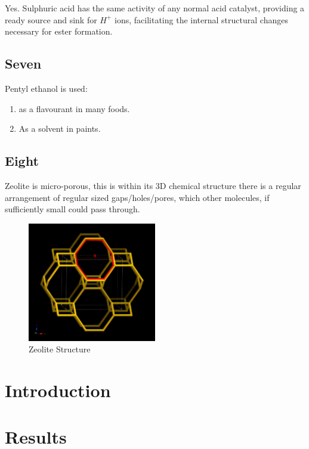 \documentclass[]{article}
\begin{document}
Yes. Sulphuric acid has the same activity of any normal acid catalyst,
providing a ready source and sink for \(H^{+}\) ions, facilitating the
internal structural changes necessary for ester formation.

\hypertarget{seven}{%
\subsection{Seven}\label{seven}}

Pentyl ethanol is used:

\begin{enumerate}
\def\labelenumi{\arabic{enumi}.}
\item
  as a flavourant in many foods.
\item
  As a solvent in paints.
\end{enumerate}

\hypertarget{eight}{%
\subsection{Eight}\label{eight}}

Zeolite is micro-porous, this is within its 3D chemical structure there
is a regular arrangement of regular sized gaps/holes/pores, which other
molecules, if sufficiently small could pass through.

\begin{figure}
\centering
\includegraphics[width=0.5\textwidth,height=\textheight]{Images/ZeoliteStructure2.jpg}
\caption{Zeolite Structure}
\end{figure}

\hypertarget{introduction}{%
\section{Introduction}\label{introduction}}

\hypertarget{results}{%
\section{Results}\label{results}}
\end{document}
